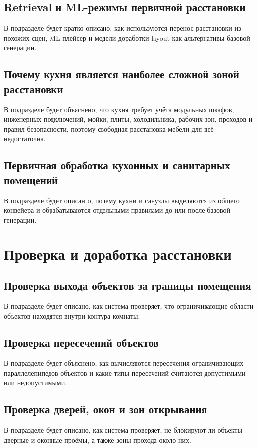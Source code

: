 \documentclass[times]{itmo-student-thesis}
\begin{document}
\subsection{Retrieval и ML-режимы первичной расстановки}
В подразделе будет кратко описано, как используются перенос расстановки из похожих сцен, ML-плейсер и модели доработки layout как альтернативы базовой генерации.

\subsection{Почему кухня является наиболее сложной зоной расстановки}
В подразделе будет объяснено, что кухня требует учёта модульных шкафов, инженерных подключений, мойки, плиты, холодильника, рабочих зон, проходов и правил безопасности, поэтому свободная расстановка мебели для неё недостаточна.

\subsection{Первичная обработка кухонных и санитарных помещений}
В подразделе будет описан о, почему кухни и санузлы выделяются из общего конвейера и обрабатываются отдельными правилами до или после базовой генерации.

\section{Проверка и доработка расстановки}

\subsection{Проверка выхода объектов за границы помещения}
В подразделе будет описано, как система проверяет, что ограничивающие области объектов находятся внутри контура комнаты.

\subsection{Проверка пересечений объектов}
В подразделе будет объяснено, как вычисляются пересечения ограничивающих параллелепипедов объектов и какие типы пересечений считаются допустимыми или недопустимыми.

\subsection{Проверка дверей, окон и зон открывания}
В подразделе будет описано, как система проверяет, не блокируют ли объекты дверные и оконные проёмы, а также зоны прохода около них.
\end{document}
